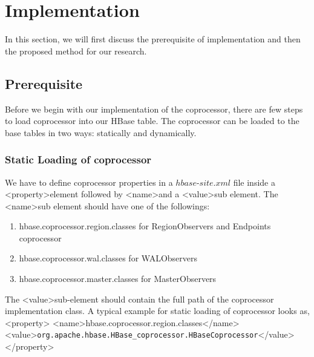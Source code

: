 \documentclass[11pt,a4paper,bibtotoc,idxtotoc,headsepline,footsepline,footexclude,BCOR12mm,DIV13]{scrbook}
\begin{document}
\newpage
\chapter{Implementation}
\label{Implementation}
In this section, we will first discuss the prerequisite of implementation and then the proposed method for our research.

\section{Prerequisite}
Before we begin with our implementation of the coprocessor, there are few steps to load coprocessor into our HBase table. The coprocessor can be loaded to the base tables in two ways: statically and dynamically\cite{loading:coprocessors}. 

\subsection{Static Loading of coprocessor}
We have to define coprocessor properties in a $hbase$-$site.xml$ file inside a \textless property\textgreater \space element followed by \textless name\textgreater \space and a \textless value\textgreater \space sub element. The \textless name\textgreater \space sub element should have one of the followings\cite{hbase:site}:

\begin{enumerate}
    \item hbase.coprocessor.region.classes for RegionObservers and Endpoints coprocessor
    \item hbase.coprocessor.wal.classes for WALObservers
    \item hbase.coprocessor.master.classes for MasterObservers
    
\end{enumerate}

The \textless value\textgreater \space sub-element should contain the full path of the coprocessor implementation class. A typical example for static loading of coprocessor looks as,\newline \newline \textless property\textgreater \newline
\textless name\textgreater hbase.coprocessor.region.classes\textless /name\textgreater \newline
\textless value\textgreater \texttt{org.apache.hbase.HBase\_coprocessor.HBaseCoprocessor}\textless /value\textgreater \newline
\textless /property\textgreater \newline
\end{document}
